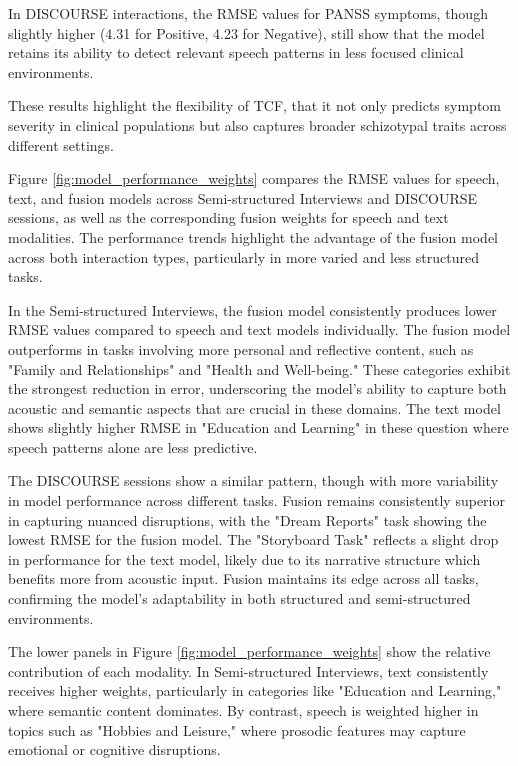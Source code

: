 \documentclass[9pt,a4paper]{rho-class/rho}
\begin{document}
In DISCOURSE interactions, the RMSE values for PANSS symptoms, though slightly higher (4.31 for Positive, 4.23 for Negative), still show that the model retains its ability to detect relevant speech patterns in less focused clinical environments.

These results highlight the flexibility of TCF, that it not only predicts symptom severity in clinical populations but also captures broader schizotypal traits across different settings.

Figure \ref{fig:model_performance_weights} compares the RMSE values for speech, text, and fusion models across Semi-structured Interviews and DISCOURSE sessions, as well as the corresponding fusion weights for speech and text modalities. The performance trends highlight the advantage of the fusion model across both interaction types, particularly in more varied and less structured tasks.

In the Semi-structured Interviews, the fusion model consistently produces lower RMSE values compared to speech and text models individually. The fusion model outperforms in tasks involving more personal and reflective content, such as "Family and Relationships" and "Health and Well-being." These categories exhibit the strongest reduction in error, underscoring the model’s ability to capture both acoustic and semantic aspects that are crucial in these domains. The text model shows slightly higher RMSE in "Education and Learning" in these question where speech patterns alone are less predictive.

The DISCOURSE sessions show a similar pattern, though with more variability in model performance across different tasks. Fusion remains consistently superior in capturing nuanced disruptions, with the "Dream Reports" task showing the lowest RMSE for the fusion model. The "Storyboard Task" reflects a slight drop in performance for the text model, likely due to its narrative structure which benefits more from acoustic input. Fusion maintains its edge across all tasks, confirming the model’s adaptability in both structured and semi-structured environments.

The lower panels in Figure \ref{fig:model_performance_weights} show the relative contribution of each modality. In Semi-structured Interviews, text consistently receives higher weights, particularly in categories like "Education and Learning," where semantic content dominates. By contrast, speech is weighted higher in topics such as "Hobbies and Leisure," where prosodic features may capture emotional or cognitive disruptions.
\end{document}
